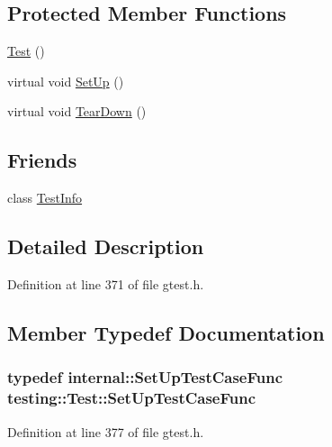\subsection*{Protected Member Functions}
\begin{DoxyCompactItemize}
\item 
\hyperlink{classtesting_1_1_test_a99f2bbfac6c95612322b0f10e607ebe5}{Test} ()
\item 
virtual void \hyperlink{classtesting_1_1_test_a190315150c303ddf801313fd1a777733}{Set\+Up} ()
\item 
virtual void \hyperlink{classtesting_1_1_test_a5f0ab439802cbe0ef7552f1a9f791923}{Tear\+Down} ()
\end{DoxyCompactItemize}
\subsection*{Friends}
\begin{DoxyCompactItemize}
\item 
class \hyperlink{classtesting_1_1_test_a4c49c2cdb6c328e6b709b4542f23de3c}{Test\+Info}
\end{DoxyCompactItemize}


\subsection{Detailed Description}


Definition at line 371 of file gtest.\+h.



\subsection{Member Typedef Documentation}
\subsubsection[{\texorpdfstring{Set\+Up\+Test\+Case\+Func}{SetUpTestCaseFunc}}]{\setlength{\rightskip}{0pt plus 5cm}typedef internal\+::\+Set\+Up\+Test\+Case\+Func {\bf testing\+::\+Test\+::\+Set\+Up\+Test\+Case\+Func}}\hypertarget{classtesting_1_1_test_a5f2a051d1d99c9b784c666c586186cf9}{}\label{classtesting_1_1_test_a5f2a051d1d99c9b784c666c586186cf9}


Definition at line 377 of file gtest.\+h.

